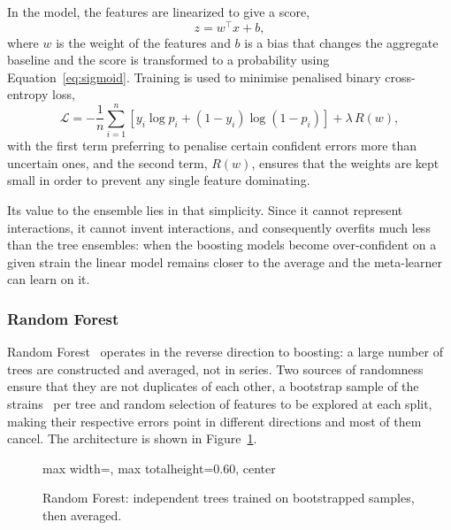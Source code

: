 In the model, the features are linearized to give a score,
\begin{equation}
z = w^\top x + b,
\label{eq:logreg_score}
\end{equation}
where $w$ is the weight of the features and $b$ is a bias that changes the aggregate baseline
and the score is transformed to a probability using Equation~\eqref{eq:sigmoid}. Training is
used to minimise penalised binary cross-entropy loss,
\begin{equation}
\mathcal{L} = -\frac{1}{n}\sum_{i=1}^{n}\left[y_i \log p_i + (1-y_i)\log(1-p_i)\right] + \lambda\,R(w),
\label{eq:logreg_loss}
\end{equation}
with the first term preferring to penalise certain confident errors more than uncertain ones,
and the second term, $R(w)$, ensures that the weights are kept small in order to prevent any
single feature dominating.

Its value to the ensemble lies in that simplicity. Since it cannot represent interactions, it cannot invent
interactions, and consequently overfits much less than the tree ensembles: when the boosting
models become over-confident on a given strain the linear model remains closer to the average
and the meta-learner can learn on it.

\subsubsection{Random Forest}

Random Forest~\cite{breiman2001rf} operates in the reverse direction to boosting: a large
number of trees are constructed and averaged, not in series. Two sources of randomness ensure
that they are not duplicates of each other, a bootstrap sample of the
strains~\cite{breiman1996bagging} per tree and random selection of features to be explored at
each split, making their respective errors point in different directions and most of them
cancel. The architecture is shown in Figure~\ref{fig:random_forest_architecture}.

\begin{figure}[H]
    \centering
    \begin{adjustbox}{max width=\textwidth, max totalheight=0.60\textheight, center}
    
    \end{adjustbox}
    \caption{Random Forest: independent trees trained on bootstrapped samples, then averaged.}
    \label{fig:random_forest_architecture}
\end{figure}

